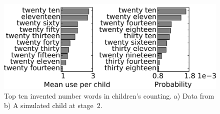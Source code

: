 \documentclass[10pt,letterpaper]{article}
\begin{document}





\begin{figure}[t]
\includegraphics[width=0.9\linewidth]{figures/inventedWordComparison3}
\caption{Top ten invented number words in children's counting. a) Data
  from \citeauthor{FusRicBriar1982} b) A simulated child at stage~2.
   \label{fig:inventedWordComparison}}
\end{figure}
\end{document}
